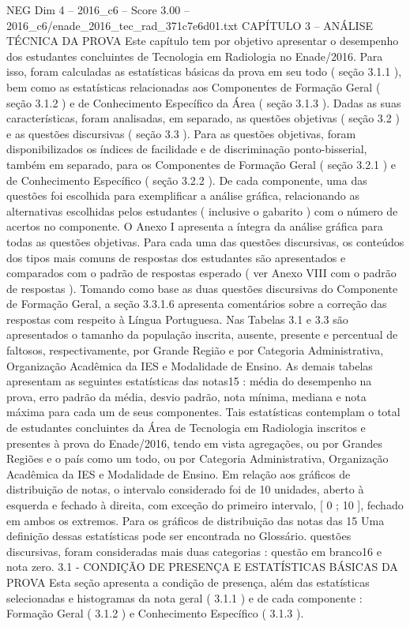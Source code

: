\begin{textsample}{NEG Dim 4 – 2016\_c6 – Score 3.00 – 2016\_c6/enade\_2016\_tec\_rad\_371c7e6d01.txt}  \label{ex:f4_neg_303}
CAPÍTULO 3 – ANÁLISE TÉCNICA DA PROVA Este capítulo tem por objetivo apresentar o desempenho dos estudantes concluintes de Tecnologia em Radiologia no Enade/2016.
Para isso, foram calculadas as estatísticas básicas da prova em seu todo ( seção 3.1.1 ), bem como as estatísticas relacionadas aos Componentes de Formação Geral ( seção 3.1.2 ) e de Conhecimento Específico da Área ( seção 3.1.3 ).
Dadas as suas características, foram analisadas, em separado, as questões objetivas ( seção 3.2 ) e as questões discursivas ( seção 3.3 ).
Para as questões objetivas, foram disponibilizados os índices de facilidade e de discriminação ponto-bisserial, também em separado, para os Componentes de Formação Geral ( seção 3.2.1 ) e de Conhecimento Específico ( seção 3.2.2 ).
De cada componente, uma das questões foi escolhida para exemplificar a análise gráfica, relacionando as alternativas escolhidas pelos estudantes ( inclusive o gabarito ) com o número de acertos no componente.
O Anexo I apresenta a íntegra da análise gráfica para todas as questões objetivas.
Para cada uma das questões discursivas, os conteúdos dos tipos mais comuns de respostas dos estudantes são apresentados e comparados com o padrão de respostas esperado ( ver Anexo VIII com o padrão de respostas ).
Tomando como base as duas questões discursivas do Componente de Formação Geral, a seção 3.3.1.6 apresenta comentários sobre a correção das respostas com respeito à Língua Portuguesa.
Nas Tabelas 3.1 e 3.3 são apresentados o tamanho da população inscrita, ausente, presente e percentual de faltosos, respectivamente, por Grande Região e por Categoria Administrativa, Organização Acadêmica da IES e Modalidade de Ensino.
As demais tabelas apresentam as seguintes estatísticas das notas15 : média do desempenho na prova, erro padrão da média, desvio padrão, nota mínima, mediana e nota máxima para cada um de seus componentes.
Tais estatísticas contemplam o total de estudantes concluintes da Área de Tecnologia em Radiologia inscritos e presentes à prova do Enade/2016, tendo em vista agregações, ou por Grandes Regiões e o país como um todo, ou por Categoria Administrativa, Organização Acadêmica da IES e Modalidade de Ensino.
Em relação aos gráficos de distribuição de notas, o intervalo considerado foi de 10 unidades, aberto à esquerda e fechado à direita, com exceção do primeiro intervalo, [ 0 ; 10 ], fechado em ambos os extremos.
Para os gráficos de distribuição das notas das 15 Uma definição dessas estatísticas pode ser encontrada no Glossário. questões discursivas, foram consideradas mais duas categorias : questão em branco16 e nota zero. 3.1 - CONDIÇÃO DE PRESENÇA E ESTATÍSTICAS BÁSICAS DA PROVA Esta seção apresenta a condição de presença, além das estatísticas selecionadas e histogramas da nota geral ( 3.1.1 ) e de cada componente : Formação Geral ( 3.1.2 ) e Conhecimento Específico ( 3.1.3 ).

\end{textsample}
